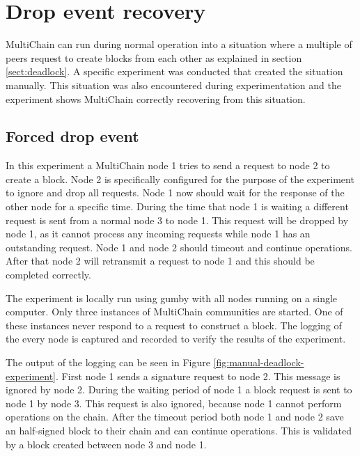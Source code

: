 \section{Drop event recovery}
\label{sect:deadlock-exp}
MultiChain can run during normal operation into a situation
where a multiple of peers request to create blocks from each other as explained in section \ref{sect:deadlock}.
A specific experiment was conducted that created the situation manually.
This situation was also encountered during experimentation
and the experiment shows MultiChain correctly recovering from this situation.

\subsection{Forced drop event}
In this experiment a MultiChain node 1 tries to send a request to node 2 to create a block.
Node 2 is specifically configured for the purpose of the experiment
to ignore and drop all requests.
Node 1 now should wait for the response of the other node for a specific time.
During the time that node 1 is waiting a different request is sent from a normal node 3 to node 1.
This request will be dropped by node 1,
as it cannot process any incoming requests while node 1 has an outstanding request.
Node 1 and node 2 should timeout and continue operations.
After that node 2 will retransmit a request to node 1 and this should be completed correctly.

The experiment is locally run using gumby with all nodes running on a single computer.
Only three instances of MultiChain communities are started.
One of these instances never respond to a request to construct a block.
The logging of the every node is captured and recorded to verify the results of the experiment.

The output of the logging can be seen in Figure \ref{fig:manual-deadlock-experiment}.
First node 1 sends a signature request to node 2.
This message is ignored by node 2.
During the waiting period of node 1 a block request is sent to node 1 by node 3.
This request is also ignored, because node 1 cannot perform operations on the chain.
After the timeout period both node 1 and node 2 save an half-signed block to their chain
and can continue operations.
This is validated by a block created between node 3 and node 1.

